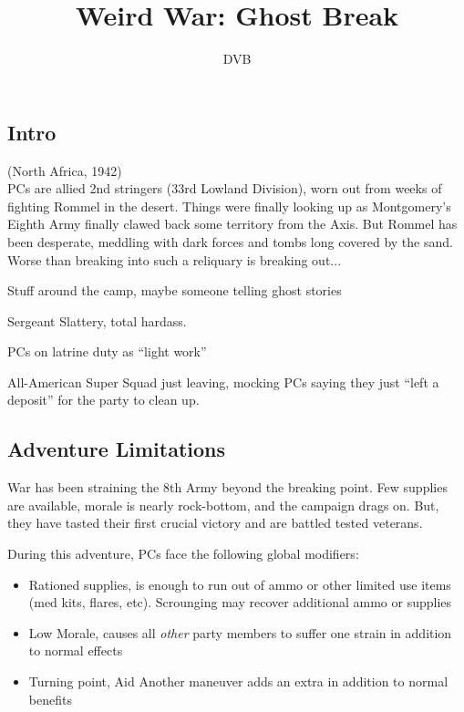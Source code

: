 \documentclass[background]{book}
\title{Weird War: Ghost Break}
\author{DVB}
\begin{document}
\maketitle

\begin{multicols}{2}
\section{Intro}
(North Africa, 1942)\\

    PCs are allied 2nd stringers (33rd Lowland Division), worn out from weeks of fighting Rommel in the desert.  Things were finally looking up as Montgomery's Eighth Army finally clawed back some territory from the Axis.  But Rommel has been desperate, meddling with dark forces and tombs long covered by the sand.  Worse than breaking into such a reliquary is breaking out...

Stuff around the camp, maybe someone telling ghost stories

Sergeant Slattery, total hardass.

PCs on latrine duty as ``light work''

All-American Super Squad just leaving, mocking PCs saying they just ``left a deposit'' for the party to clean up.

    \subsection{Adventure Limitations}

    War has been straining the 8th Army beyond the breaking point.  Few supplies are available, morale is nearly rock-bottom, and the campaign drags on.  But, they have tasted their first crucial victory and are battled tested veterans.
    
    During this adventure, PCs face the following global modifiers:

    \begin{itemize}
        \item Rationed supplies, \Threat\Threat is enough to run out of ammo or other limited use items (med kits, flares, etc).  Scrounging may recover additional ammo or supplies
        \item Low Morale, \Despair causes all \emph{other} party members to suffer one strain in addition to normal effects
        \item Turning point, Aid Another maneuver adds an extra \Advantage\Advantage in addition to normal benefits
    \end{itemize}


\end{multicols}
\end{document}

